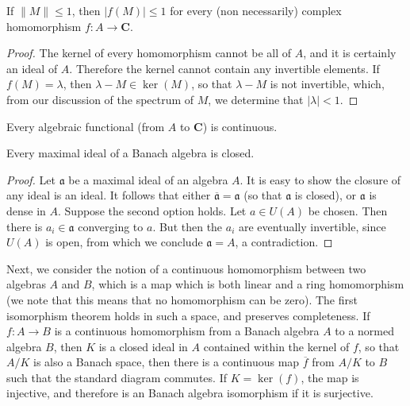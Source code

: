 \begin{lemma}
    If $\| M \| \leq 1$, then $|f(M)| \leq 1$ for every (non necessarily) complex homomorphism $f: A \to \mathbf{C}$.
\end{lemma}
\begin{proof}
    The kernel of every homomorphism cannot be all of $A$, and it is certainly an ideal of $A$. Therefore the kernel cannot contain any invertible elements. If $f(M) = \lambda$, then $\lambda - M \in \ker(M)$, so that $\lambda - M$ is not invertible, which, from our discussion of the spectrum of $M$, we determine that $|\lambda| < 1$.
\end{proof}

\begin{corollary}
    Every algebraic functional (from $A$ to $\mathbf{C}$) is continuous.
\end{corollary}

\begin{lemma}
    Every maximal ideal of a Banach algebra is closed.
\end{lemma}
\begin{proof}
    Let $\mathfrak{a}$ be a maximal ideal of an algebra $A$. It is easy to show the closure of any ideal is an ideal. It follows that either $\overline{\mathfrak{a}} = \mathfrak{a}$ (so that $\mathfrak{a}$ is closed), or $\mathfrak{a}$ is dense in $A$. Suppose the second option holds. Let $a \in U(A)$ be chosen. Then there is $a_i \in \mathfrak{a}$ converging to $a$. But then the $a_i$ are eventually invertible, since $U(A)$ is open, from which we conclude $\mathfrak{a} = A$, a contradiction.
\end{proof}

Next, we consider the notion of a continuous homomorphism between two algebras $A$ and $B$, which is a map which is both linear and a ring homomorphism (we note that this means that no homomorphism can be zero). The first isomorphism theorem holds in such a space, and preserves completeness. If $f:A \to B$ is a continuous homomorphism from a Banach algebra $A$ to a normed algebra $B$, then $K$ is a closed ideal in $A$ contained within the kernel of $f$, so that $A/K$ is also a Banach space, then there is a continuous map $\overline{f}$ from $A/K$ to $B$ such that the standard diagram commutes. If $K = \ker(f)$, the map is injective, and therefore is an Banach algebra isomorphism if it is surjective.

